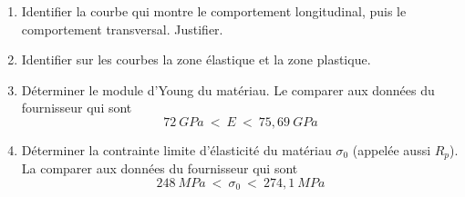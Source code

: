 \documentclass[lecture.tex]{subfiles}
\begin{document}
\bigskip

\begin{enumerate}
  \item Identifier la courbe qui montre le comportement longitudinal, puis le comportement transversal. Justifier.
  \item Identifier sur les courbes la zone élastique et la zone plastique.
  \item Déterminer le module d'Young du matériau. Le comparer aux données du fournisseur qui sont
  $$72 \ GPa \ < \ E \ < \ 75,69 \ GPa$$
  \item Déterminer la contrainte limite d'élasticité du matériau $\sigma_{0}$ (appelée aussi $R_p$). La comparer aux données du fournisseur qui sont
  $$248  \ MPa \ < \ \sigma_{0} \ < \ 274,1 \ MPa$$
\end{enumerate}

\finexercice
\end{document}
